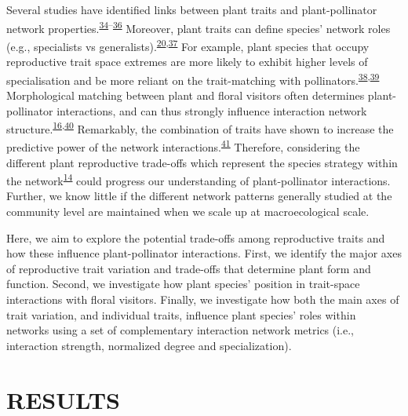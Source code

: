 \documentclass[
  12pt,
  a4paper,
]{article}
\begin{document}
Several studies have identified links between plant traits and plant-pollinator network properties.\textsuperscript{\protect\hyperlink{ref-bartomeus2013}{34}--\protect\hyperlink{ref-rowe2020}{36}} Moreover, plant traits can define species' network roles (e.g., specialists vs generalists).\textsuperscript{\protect\hyperlink{ref-tur2013}{20},\protect\hyperlink{ref-lazaro2013}{37}} For example, plant species that occupy reproductive trait space extremes are more likely to exhibit higher levels of specialisation and be more reliant on the trait-matching with pollinators.\textsuperscript{\protect\hyperlink{ref-junker2013}{38},\protect\hyperlink{ref-coux2016}{39}} Morphological matching between plant and floral visitors often determines plant-pollinator interactions, and can thus strongly influence interaction network structure.\textsuperscript{\protect\hyperlink{ref-stang2009}{16},\protect\hyperlink{ref-ibanez2012}{40}} Remarkably, the combination of traits have shown to increase the predictive power of the network interactions.\textsuperscript{\protect\hyperlink{ref-eklof2013}{41}} Therefore, considering the different plant reproductive trade-offs which represent the species strategy within the network\textsuperscript{\protect\hyperlink{ref-dehling2016}{14}} could progress our understanding of plant-pollinator interactions. Further, we know little if the different network patterns generally studied at the community level are maintained when we scale up at macroecological scale.

Here, we aim to explore the potential trade-offs among reproductive traits and how these influence plant-pollinator interactions. First, we identify the major axes of reproductive trait variation and trade-offs that determine plant form and function. Second, we investigate how plant species' position in trait-space interactions with floral visitors. Finally, we investigate how both the main axes of trait variation, and individual traits, influence plant species' roles within networks using a set of complementary interaction network metrics (i.e., interaction strength, normalized degree and specialization).

\hypertarget{results}{%
\section{RESULTS}\label{results}}
\end{document}
